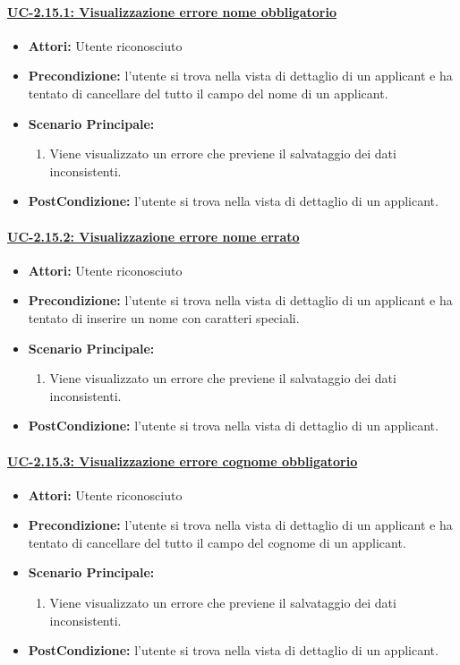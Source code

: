 \paragraph{\underline{UC-2.15.1: Visualizzazione errore nome obbligatorio}}
\begin{itemize}	
	\item \textbf{Attori:} Utente riconosciuto
	\item \textbf{Precondizione:}  l'utente si trova nella vista di dettaglio di un applicant e ha tentato di cancellare del tutto il campo del nome di un applicant.
	\item \textbf{Scenario Principale:}
	\begin{enumerate}
		\item Viene visualizzato un errore che previene il salvataggio dei dati inconsistenti.
	\end{enumerate}
	\item \textbf{PostCondizione:} l'utente si trova nella vista di dettaglio di un applicant.
\end{itemize}

\paragraph{\underline{UC-2.15.2: Visualizzazione errore nome errato}}
\begin{itemize}	
	\item \textbf{Attori:} Utente riconosciuto
	\item \textbf{Precondizione:}  l'utente si trova nella vista di dettaglio di un applicant e ha tentato di inserire un nome con caratteri speciali.
	\item \textbf{Scenario Principale:}
	\begin{enumerate}
		\item Viene visualizzato un errore che previene il salvataggio dei dati inconsistenti.
	\end{enumerate}
	\item \textbf{PostCondizione:} l'utente si trova nella vista di dettaglio di un applicant.
\end{itemize}

\paragraph{\underline{UC-2.15.3: Visualizzazione errore cognome obbligatorio}}
\begin{itemize}	
	\item \textbf{Attori:} Utente riconosciuto
	\item \textbf{Precondizione:}  l'utente si trova nella vista di dettaglio di un applicant e ha tentato di cancellare del tutto il campo del cognome di un applicant.
	\item \textbf{Scenario Principale:}
	\begin{enumerate}
		\item Viene visualizzato un errore che previene il salvataggio dei dati inconsistenti.
	\end{enumerate}
	\item \textbf{PostCondizione:} l'utente si trova nella vista di dettaglio di un applicant.
\end{itemize}

